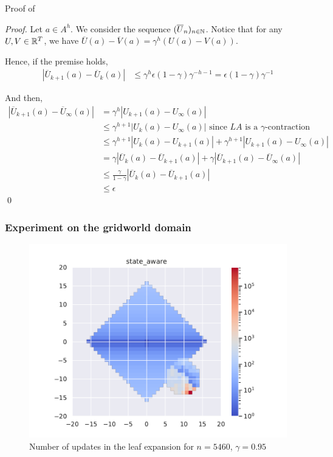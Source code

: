 \documentclass[runningheads]{llncs}
\begin{document}
Proof of 
\begin{proof}
	Let $a\in A^h$. We consider the sequence $(\overline{U}_n)_{n\in\mathbb{N}}$.
	Notice that for any $U,V\in\mathbb{R}^T$, we have $\overline{U}(a)-\overline{V}(a)=\gamma^h(U(a)-V(a))$.
	
	Hence, if the premise holds,
	\begin{align*}
	|\overline{U}_{k+1}(a) - \overline{U}_{k}(a)| &\leq \gamma^h\epsilon (1-\gamma)\gamma^{-h-1} = \epsilon (1-\gamma)\gamma^{-1}
	\end{align*}
	
	And then,
	\begin{align*}
	|\overline{U}_{k+1}(a) - \overline{U}_\infty(a)| &= \gamma^h |U_{k+1}(a) - U_\infty(a)|\\
	&\leq \gamma^{h+1}|U_{k}(a) - U_\infty(a)| \text{ since $LA$ is a $\gamma$-contraction}\\
	&\leq \gamma^{h+1}|U_{k}(a) - U_{k+1}(a)| + \gamma^{h+1}|U_{k+1}(a) - U_\infty(a)|\\
	&= \gamma|\overline{U}_{k}(a) - \overline{U}_{k+1}(a)| + \gamma |\overline{U}_{k+1}(a) - \overline{U}_\infty(a)|\\
	&\leq \frac{\gamma}{1-\gamma} |\overline{U}_{k}(a) - \overline{U}_{k+1}(a)|\\
	&\leq\epsilon
	\end{align*}
	\qed\end{proof}


\subsubsection{Experiment on the gridworld domain}

\begin{figure}[H]
	\centering
	\includegraphics[width=0.44\linewidth]{img/updates_GBOP-D.pdf}
	\caption{Number of updates in the leaf expansion for $n = 5460$, $\gamma=0.95$}
	\label{fig:gw4_updates}
\end{figure}
\end{document}
